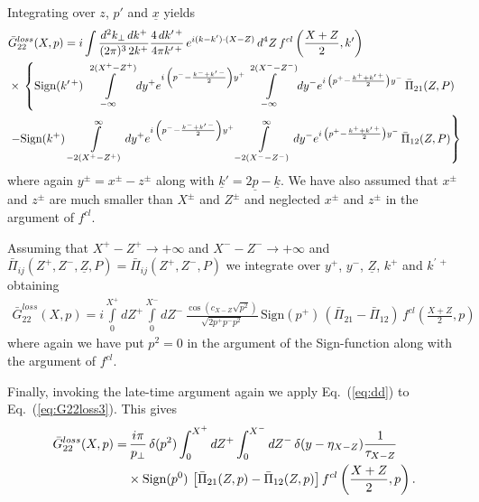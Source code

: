\documentclass[onecolumn,showpacs,nobibnotes,nofootinbib,12pt,aps,prd,showpacs,notitlepage,nofootinbib,preprintnumbers,amsmath,amssymb]{article}
\def\eq#1{{Eq.~(\ref{#1})}}
\newcommand{\un}[1]{\underline{#1}}
\begin{document}
Integrating over $z$, $p'$ and $\un{x}$ yields
\begin{align}  \label{eq:G22loss2}
  & \bar G^{loss}_{22}(X,p)= i \int \frac{d^2 k_\perp \, d
    k^+}{(2\pi)^3 \, 2k^+} \frac{4 \, d k^{\prime \, +}}{4 \pi
    k^{\prime \, +}} \, e^{i (k-k') \cdot (X-Z)} \, d^4 Z \, f^{cl}
  \left( \frac{X+Z}{2}, k'\right) \\ & \times \, \left\{ \mbox{Sign}
    (k^{\prime \, +}) \, \int\limits_{-\infty}^{2 (X^+ - Z^+)} d y^+
    e^{i \, \left(p^--\frac{k^-+ k^{\prime \, -}}{2}\right) y^+ }
    \int\limits_{-\infty}^{2 (X^- - Z^-)} d y^- e^{i \, \left(p^+ -
        \frac{k^+ + k^{\prime \, +}}{2}\right) y^-} \, \bar\Pi_{21}
    (Z,P) \right. \notag \\ & \left. - \mbox{Sign} (k^{+}) \,
    \int\limits_{-2 (X^+ - Z^+)}^{\infty} d y^+ e^{i \,
      \left(p^--\frac{k^-+ k^{\prime \, -}}{2}\right) y^+ }
    \int\limits_{-2 (X^- - Z^-)}^{\infty} d y^- e^{i \, \left(p^+ -
        \frac{k^+ + k^{\prime \, +}}{2}\right) y^-} \, \bar\Pi_{12}
    (Z,P) \right\} \notag
\end{align}
where again $y^\pm = x^\pm - z^\pm$ along with $\un{k}' = 2 \un{p} -
\un{k}$. We have also assumed that $x^\pm$ and $z^\pm$ are much
smaller than $X^\pm$ and $Z^\pm$ and neglected $x^\pm$ and $z^\pm$ in
the argument of $f^{cl}$.

Assuming that $X^+ - Z^+ \to +\infty $ and $X^- - Z^- \to + \infty$
and $\bar\Pi_{ij}(Z^+, Z^-, \un{Z},P) = \bar\Pi_{ij}(Z^+, Z^-,P)$ we
integrate over $y^+$, $y^-$, $\un{Z}$, $k^+$ and $k^{\prime \, +}$
obtaining
\begin{align} 
  \label{eq:G22loss3}
  \bar G^{loss}_{22}(X,p)= i \int\limits_0^{X^+} dZ^+
  \int\limits_0^{X^-} dZ^- \,
  \frac{\cos(c_{X-Z}\sqrt{p^2})}{\sqrt{2p^+p^- p^2}} \, \mbox{Sign}
  (p^+) \, (\bar\Pi_{21}-\bar\Pi_{12}) \, f^{cl} \left( \frac{X+Z}{2},
    p \right)
\end{align}
where again we have put $p^2 =0$ in the argument of the Sign-function
along with the argument of $f^{cl}$.

Finally, invoking the late-time argument again we apply \eq{eq:dd} to
\eq{eq:G22loss3}. This gives
\begin{align}
  \bar G_{22}^{loss}(X,p) = & \, \frac{i\pi}{p_\perp} \, \delta(p^2) \int_0^{X^+} dZ^+ \int_0^{X^-} dZ^- \, \delta(y-\eta_{X-Z}) \frac{1}{\tau_{X-Z}} \notag \\
  & \times \mbox{Sign} (p^0) \,
  \left[\bar\Pi_{21}(Z,p)-\bar\Pi_{12}(Z,p)\right] f^{cl}\left(
    \frac{X+Z}{2}, p \right). \label{eq:G22lossPi}
\end{align}
\end{document}
